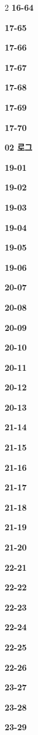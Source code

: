 \documentclass[10pt,a4paper]{article}
\begin{document}
\begin{multicols}{2}
\noindent\textbf{16-64}\ \par
\noindent\textbf{17-65}\ \par
\noindent\textbf{17-66}\ \par
\noindent\textbf{17-67}\ \par
\noindent\textbf{17-68}\ \par
\noindent\textbf{17-69}\ \par
\noindent\textbf{17-70}\ \par
\noindent\textbf{02 로그}\par\smallskip
\noindent\textbf{19-01}\ \par
\noindent\textbf{19-02}\ \par
\noindent\textbf{19-03}\ \par
\noindent\textbf{19-04}\ \par
\noindent\textbf{19-05}\ \par
\noindent\textbf{19-06}\ \par
\noindent\textbf{20-07}\ \par
\noindent\textbf{20-08}\ \par
\noindent\textbf{20-09}\ \par
\noindent\textbf{20-10}\ \par
\noindent\textbf{20-11}\ \par
\noindent\textbf{20-12}\ \par
\noindent\textbf{20-13}\ \par
\noindent\textbf{21-14}\ \par
\noindent\textbf{21-15}\ \par
\noindent\textbf{21-16}\ \par
\noindent\textbf{21-17}\ \par
\noindent\textbf{21-18}\ \par
\noindent\textbf{21-19}\ \par
\noindent\textbf{21-20}\ \par
\noindent\textbf{22-21}\ \par
\noindent\textbf{22-22}\ \par
\noindent\textbf{22-23}\ \par
\noindent\textbf{22-24}\ \par
\noindent\textbf{22-25}\ \par
\noindent\textbf{22-26}\ \par
\noindent\textbf{23-27}\ \par
\noindent\textbf{23-28}\ \par
\noindent\textbf{23-29}\ \par

\end{multicols}
\end{document}
